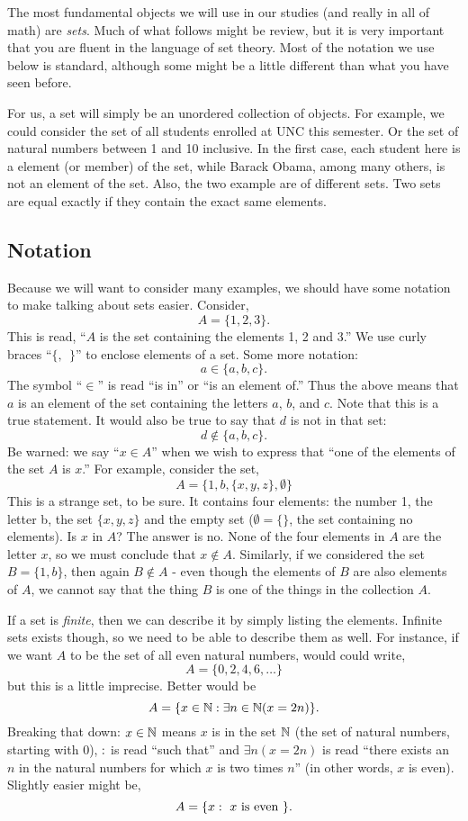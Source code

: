 \documentclass[12pt]{article}
\begin{document}
The most fundamental objects we will use in our studies (and really in all of math) are \textit{sets}.  Much of what follows might be review, but it is very important that you are fluent in the language of set theory.  Most of the notation we use below is standard, although some might be a little different than what you have seen before.

For us, a set will simply be an unordered collection of objects.  For example, we could consider the set of all students enrolled at UNC this semester.  Or the set of natural numbers between 1 and 10 inclusive.  In the first case, each student here is a element (or member) of the set, while Barack Obama, among many others, is not an element of the set.  Also, the two example are of different sets.  Two sets are equal exactly if they contain the exact same elements.



\subsection{Notation}

Because we will want to consider many examples, we should have some notation to make talking about sets easier.  Consider,
\[ A = \{1, 2, 3\}.\]
This is read, ``$A$ is the set containing the elements 1, 2 and 3.''  We use curly braces ``$\{,~~ \}$'' to enclose elements of a set.  Some more notation:
\[ a \in \{a, b, c\}. \]
The symbol ``$\in$'' is read ``is in'' or ``is an element of.''  Thus the above means that $a$ is an element of the set containing the letters $a$, $b$, and $c$.  Note that this is a true statement.  It would also be true to say that $d$ is not in that set:
\[ d \not\in \{a, b, c\}.\]
Be warned: we say ``$x \in A$'' when we wish to express that ``one of the elements of the set $A$ is $x$.''  For example, consider the set,
\[A = \{1, b, \{x, y, z\}, \emptyset\}\]
This is a strange set, to be sure. It contains four elements: the number 1, the letter b, the set $\{x,y,z\}$ and the empty set ($\emptyset = \{ \}$, the set containing no elements).  Is $x$ in $A$?  The answer is no.  None of the four elements in $A$ are the letter $x$, so we must conclude that $x \notin A$.  Similarly, if we considered the set $B = \{1,b\}$, then again $B \notin A$ - even though the elements of $B$ are also elements of $A$, we cannot say that the thing $B$ is one of the things in the collection $A$. 

If a set is {\em finite}, then we can describe it by simply listing the elements.  Infinite sets exists though, so we need to be able to describe them as well.  For instance, if we want $A$ to be the set of all even natural numbers, would could write,
\[ A = \{0, 2, 4, 6, \ldots\}\]
but this is a little imprecise.  Better would be
\[ A = \{x \in \mathbb N : \exists n\in \mathbb N ( x = 2 n)\}.\]
Breaking that down: $x \in \mathbb N$ means $x$ is in the set $\mathbb N$ (the set of natural numbers, starting with 0), $:$ is read ``such that'' and $\exists n (x = 2n)$ is read ``there exists an $n$ in the natural numbers for which $x$ is two times $n$'' (in other words, $x$ is even).  Slightly easier might be,
\[ A = \{x : \mbox{ $x$ is even }\}. \]
\end{document}
